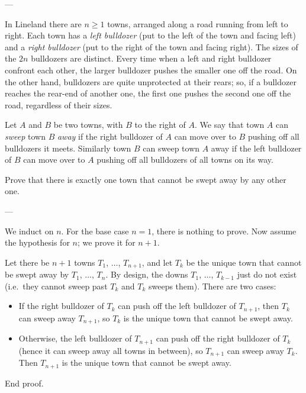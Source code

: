 
---

In Lineland there are $n\geq1$ towns, arranged along a road running from left to right. Each town has a \emph{left bulldozer} (put to the left of the town and facing left) and a \emph{right bulldozer} (put to the right of the town and facing right). The sizes of the $2n$ bulldozers are distinct. Every time when a left and right bulldozer confront each other, the larger bulldozer pushes the smaller one off the road. On the other hand, bulldozers are quite unprotected at their rears; so, if a bulldozer reaches the rear-end of another one, the first one pushes the second one off the road, regardless of their sizes.

Let $A$ and $B$ be two towns, with $B$ to the right of $A$. We say that town $A$ can \emph{sweep} town $B$ \emph{away} if the right bulldozer of $A$ can move over to $B$ pushing off all bulldozers it meets. Similarly town $B$ can sweep town $A$ away if the left bulldozer of $B$ can move over to $A$ pushing off all bulldozers of all towns on its way.

Prove that there is exactly one town that cannot be swept away by any other one.

---

We induct on $n$. For the base case $n=1$, there is nothing to prove. Now assume the hypothesis for $n$; we prove it for $n+1$.

Let there be $n+1$ towns $T_1$, $\ldots$, $T_{n+1}$, and let $T_k$ be the unique town that cannot be swept away by $T_1$, $\ldots$, $T_n$. By design, the downs $T_1$, $\ldots$, $T_{k-1}$ just do not exist (i.e.\ they cannot sweep past $T_k$ and $T_k$ sweeps them). There are two cases:
\begin{itemize}
    \item If the right bulldozer of $T_k$ can push off the left bulldozer of $T_{n+1}$, then $T_k$ can sweep away $T_{n+1}$, so $T_k$ is the unique town that cannot be swept away.
    \item Otherwise, the left bulldozer of $T_{n+1}$ can push off the right bulldozer of $T_k$ (hence it can sweep away all towns in between), so $T_{n+1}$ can sweep away $T_k$. Then $T_{n+1}$ is the unique town that cannot be swept away.
\end{itemize}
End proof.

